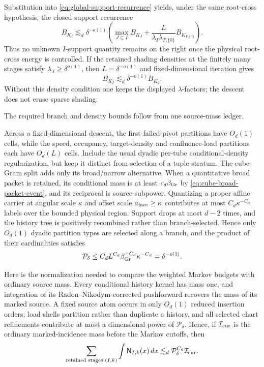 \documentclass[11pt]{article}
\begin{document}
Substitution into \eqref{eq:global-support-recurrence} yields, under the same
root-cross hypothesis, the closed support recurrence
\begin{equation}\label{eq:closed-support-recurrence}
 \boxed{
 B_{K_I}
 \lesssim_d
 \delta^{-o(1)}
 \left(
  \max_{J\subsetneq I}B_{K_J}
  +
  \frac{L}{\lambda_I\lambda_{I\setminus\{0\}}}
  B_{K_{I\setminus\{0\}}}
 \right).}
\end{equation}
Thus no unknown \(I\)-support quantity remains on the right once the physical
root-cross energy is controlled.  If the retained
shading densities at the finitely many stages satisfy
\(\lambda_J\ge\delta^{o(1)}\), then \(L=\delta^{-o(1)}\) and fixed-dimensional
iteration gives
\begin{equation}\label{eq:support-induction-closure}
 B_{K_I}
 \lesssim_d
 \delta^{-o(1)}B_{K_2}.
\end{equation}
Without this density condition one keeps the displayed \(\lambda\)-factors;
the descent does not erase sparse shading.

The required branch and density bounds follow from one source-mass ledger.

Across a fixed-dimensional descent, the first-failed-pivot partitions have
\(O_d(1)\) cells, while the speed, occupancy, target-density and confluence-load
partitions each have \(O_d(L)\) cells.  Include the usual dyadic per-tube
conditional-density regularization, but keep it distinct from selection of a
tuple stratum.  The cube-Gram split adds only its broad/narrow alternative.
When a quantitative broad packet is retained, its conditional mass is at
least \(c_d\beta_{\rm Gr}\) by \eqref{eq:cube-broad-packet-event}, and its
reciprocal is source-subpower.  Quantizing a proper affine carrier at angular
scale \(\kappa\) and offset scale \(a_{\rm face}\ge\kappa\) contributes at
most \(C_d\kappa^{-C_d}\) labels over the bounded physical region.
Support drops at most \(d-2\) times, and
the history tree is positively recombined rather than branch-selected.  Hence
only \(O_d(1)\) dyadic partition types are selected along a branch, and the
product of their cardinalities satisfies
\begin{equation}\label{eq:source-partition-count}
 \mathcal P_\delta
 \le C_d L^{C_d}
       \beta_{\rm Gr}^{-C_d}\kappa^{-C_d}
 =\delta^{-o(1)}.
\end{equation}

Here is the normalization needed to compare the weighted Markov budgets with
ordinary source mass.  Every conditional history kernel has mass one, and
integration of its Radon--Nikodym-corrected pushforward recovers the mass of
its marked source.  A fixed source atom occurs in only \(O_d(1)\) reduced
insertion orders; load shells partition rather than duplicate a history, and
all selected chart refinements contribute at most a dimensional power of
\(\mathcal P_\delta\).  Hence, if \(\mathcal I_{\rm cur}\) is the ordinary
marked-incidence mass before the Markov cutoffs, then
\begin{equation}\label{eq:weighted-ordinary-mass-ledger}
 \sum_{\text{retained stages }(I,k)}
 \int\mathsf N_{I,k}(x)\,dx
 \lesssim_d
 \mathcal P_\delta^{C_d}\mathcal I_{\rm cur}.
\end{equation}
\end{document}
